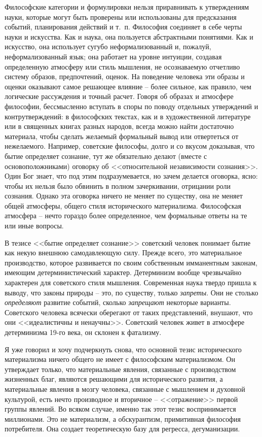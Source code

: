 \documentclass{book}
\begin{document}
Философские категории и формулировки нельзя приравнивать к утверждениям науки, которые могут быть проверены или использованы для 
предсказания событий, планирования действий и т.~п. Философия соединяет в себе черты науки и искусства. Как и наука, она 
пользуется абстрактными понятиями. Как и искусство, она использует сугубо неформализован­ный и, пожалуй, неформализованный язык; 
она работает на уров­не интуиции, создавая определенную атмосферу или стиль мышления, не осознаваемую отчетливо систему образов, 
предпочтений, оценок. На поведение человека эти образы и оценки оказывают самое решающее влияние -- более сильное, как правило, 
чем логические рассуждения и точный расчет. Говоря об об­разах и атмосфере философии, бессмысленно вступать в споры по поводу 
отдельных утверждений и контрутверждений: в философских текстах, как и в художественной литературе или в священных книгах разных 
народов, всегда можно найти достаточно материала, чтобы сделать желаемый формальный вывод или отвертеться от нежелаемого. 
Например, советские философы, долго и со вкусом доказывая, что бытие определяет сознание, тут же обязательно делают (вместе с 
основоположника­ми) оговорку об <<относительной независимости сознания>>. Один Бог знает, что под этим подразумевается, но зачем 
делается оговорка, ясно: чтобы их нельзя было обвинить в полном зачеркивании, отрицании роли сознания. Однако эта оговорка 
ничего не меняет по существу, она не меняет общей атмосферы, общего стиля исторического материализма. Философская атмосфера -- 
нечто гораздо более определенное, чем формальные ответы на те или иные вопросы.

В тезисе <<бытие определяет сознание>> советский человек понимает бытие как некую внешнюю самодавлеющую силу. Прежде всего, это 
материальное производство, которое раз­вивается по своим собственным имманентным законам, имею­щим детерминистический характер. 
Детерминизм вообще чрезвычайно характерен для советского стиля мышления. Современная наука твердо пришла к выводу, что законы 
природы -- это, по существу, только \textit{запреты}.  Они не столько \textit{определяют} развитие событий, сколько 
\textit{запрещают}  некоторые варианты. Советского человека всячески оберегают от таких представле­ний, внушают, что они 
<<идеалистичны и ненаучны>>. Советский человек живет в атмосфере детерминизма 19-го века, он склонен к фатализму.

Я уже говорил и хочу подчеркнуть снова, что основной тезис исторического материализма ничего общего не имеет с философским 
материализмом. Он утверждает только, что материальные явления, связанные с производством жизненных благ, являются решающими для 
исторического развития, а материальные явления в мозгу человека, связанные с мышлением и духовной культурой, есть нечто 
производное и вторичное -- <<отражение>> первой группы явлений. Во всяком случае, имен­но так этот тезис воспринимается миллионами. 
Это не матери­ализм, а обскурантизм, примитивная философия потребителя. Она создает теоретическую базу для регресса, 
дегуманизации.
\end{document}
